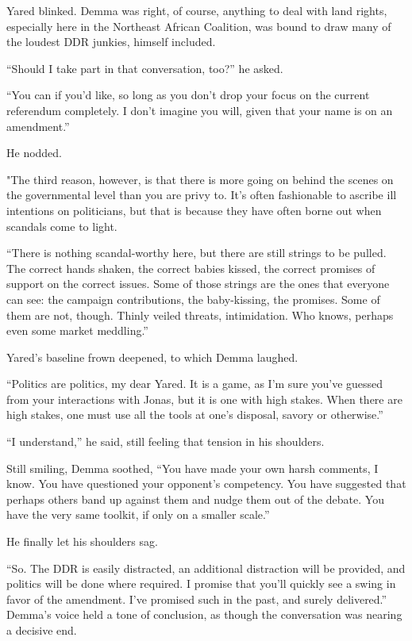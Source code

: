 Yared blinked. Demma was right, of course, anything to deal with land rights, especially here in the Northeast African Coalition, was bound to draw many of the loudest DDR junkies, himself included.

``Should I take part in that conversation, too?'' he asked.

``You can if you'd like, so long as you don't drop your focus on the current referendum completely. I don't imagine you will, given that your name is on an amendment.''

He nodded.

"The third reason, however, is that there is more going on behind the scenes on the governmental level than you are privy to. It's often fashionable to ascribe ill intentions on politicians, but that is because they have often borne out when scandals come to light.

``There is nothing scandal-worthy here, but there are still strings to be pulled. The correct hands shaken, the correct babies kissed, the correct promises of support on the correct issues. Some of those strings are the ones that everyone can see: the campaign contributions, the baby-kissing, the promises. Some of them are not, though. Thinly veiled threats, intimidation. Who knows, perhaps even some market meddling.''

Yared's baseline frown deepened, to which Demma laughed.

``Politics are politics, my dear Yared. It is a game, as I'm sure you've guessed from your interactions with Jonas, but it is one with high stakes. When there are high stakes, one must use all the tools at one's disposal, savory or otherwise.''

``I understand,'' he said, still feeling that tension in his shoulders.

Still smiling, Demma soothed, ``You have made your own harsh comments, I know. You have questioned your opponent's competency. You have suggested that perhaps others band up against them and nudge them out of the debate. You have the very same toolkit, if only on a smaller scale.''

He finally let his shoulders sag.

``So. The DDR is easily distracted, an additional distraction will be provided, and politics will be done where required. I promise that you'll quickly see a swing in favor of the amendment. I've promised such in the past, and surely delivered.'' Demma's voice held a tone of conclusion, as though the conversation was nearing a decisive end.

